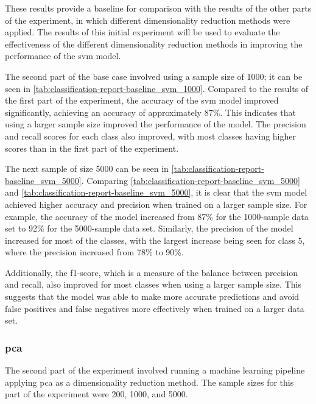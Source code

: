 These results provide a baseline for comparison with the results of the other parts of the experiment, in which different dimensionality reduction methods were applied. The results of this initial experiment will be used to evaluate the effectiveness of the different dimensionality reduction methods in improving the performance of the \gls{svm} model.

The second part of the base case involved using a sample size of 1000; it can be seen in \ref{tab:classification-report-baseline_svm_1000}. Compared to the results of the first part of the experiment, the accuracy of the \gls{svm} model improved significantly, achieving an accuracy of approximately 87\%. This indicates that using a larger sample size improved the performance of the model. The precision and recall scores for each class also improved, with most classes having higher scores than in the first part of the experiment.

The next sample of size 5000 can be seen in \ref{tab:classification-report-baseline_svm_5000}.
Comparing \ref{tab:classification-report-baseline_svm_5000} and \ref{tab:classification-report-baseline_svm_5000}, it is clear that the \gls{svm} model achieved higher accuracy and precision when trained on a larger sample size. For example, the accuracy of the model increased from 87\% for the 1000-sample data set to 92\% for the 5000-sample data set. Similarly, the precision of the model increased for most of the classes, with the largest increase being seen for class 5, where the precision increased from 78\% to 90\%.

Additionally, the f1-score, which is a measure of the balance between precision and recall, also improved for most classes when using a larger sample size. This suggests that the model was able to make more accurate predictions and avoid false positives and false negatives more effectively when trained on a larger data set.


\subsubsection{\gls{pca}}\label{subsubsec:experiment_4_pca}

The second part of the experiment involved running a machine learning pipeline applying \gls{pca} as a dimensionality reduction method. The sample sizes for this part of the experiment were 200, 1000, and 5000.



